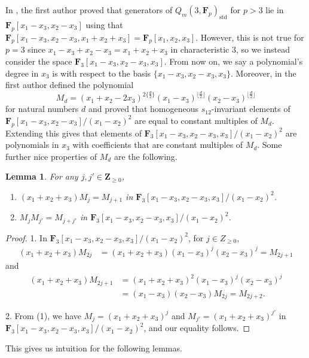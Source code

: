 \documentclass[11pt]{article}
\numberwithin{equation}{section}
\newtheorem{Lemma}[Theorem]{Lemma}
\theoremstyle{definition}
\numberwithin{equation}{section}
\newcommand{\std}{\mathrm{std}}
\begin{document}
In \cite{wang2022explicit}, the first author proved that generators of $Q_m(3,\mathbf{F}_p)_{\std}$ for $p>3$ lie in $\mathbf{F}_p[x_1-x_3,\allowbreak {x_2-x_3}]$ using that $\mathbf{F}_p[x_1-x_3,x_2-x_3,x_1+x_2+x_3]=\mathbf{F}_p[x_1,x_2,x_3]$. However, this is not true for $p=3$ since $x_1-x_3+x_2-x_3=x_1+x_2+x_3$ in characteristic $3$, so we instead consider the space $\mathbf{F}_3[x_1-x_3,x_2-x_3,x_3]$. From now on, we say a polynomial's degree in $x_3$ is with respect to the basis $\{x_1-x_3,x_2-x_3,x_3\}$. Moreover, in \cite{wang2022explicit} the first author defined the polynomial
\[M_d = (x_1+x_2-2x_3)^{2\{ \frac{d}{2}\}}(x_1-x_3)^{\lfloor\frac{d}{2}\rfloor}(x_2-x_3)^{\lfloor\frac{d}{2}\rfloor}\]
for natural numbers $d$ and proved that homogeneous $s_{12}$-invariant elements of $\mathbf{F}_p[x_1-x_3,x_2-x_3]/(x_1-x_2)^2$ are equal to constant multiples of $M_d$. Extending this gives that elements of $\mathbf{F}_3[x_1-x_3,x_2-x_3,x_3]/(x_1-x_2)^2$ are polynomials in $x_3$ with coefficients that are constant multiples of $M_d$. Some further nice properties of $M_d$ are the following.

\begin{Lemma}\label{M_dProps}
 For any $j,j'\in \mathbf{Z}_{\geq 0}$,
 \begin{enumerate}\itemsep=0pt
 \item[$1.$] $(x_1+x_2+x_3)M_j = M_{j+1}$ in $\mathbf{F}_3[x_1-x_3,x_2-x_3,x_3]/(x_1-x_2)^2$.
 \item[$2.$] $M_{j}M_{j'}=M_{j+j'}$ in $\mathbf{F}_3[x_1-x_3,x_2-x_3,x_3]/(x_1-x_2)^2$.
 \end{enumerate}
\end{Lemma}
\begin{proof}
1. In $\mathbf{F}_3[x_1-x_3,x_2-x_3,x_3]/(x_1-x_2)^2$, for $j\in Z_{\geq 0}$, \begin{align*}
 (x_1+x_2+x_3)M_{2j} &= (x_1+x_2+x_3)(x_1-x_3)^j(x_2-x_3)^j
 = M_{2j+1}
 \end{align*}
 and
 \begin{align*}
 (x_1+x_2+x_3)M_{2j+1} &= (x_1+x_2+x_3)^2(x_1-x_3)^j(x_2-x_3)^j \\
 &= (x_1-x_3)(x_2-x_3)M_{2j}
 = M_{2j+2}.
 \end{align*}

2. From (1), we have $M_j=(x_1+x_2+x_3)^j$ and $M_{j'}=(x_1+x_2+x_3)^{j'}$ in $\mathbf{F}_3[x_1-x_3,x_2-x_3,x_3]/(x_1-x_2)^2$, and our equality follows.
\end{proof}

This gives us intuition for the following lemmas.
\end{document}
